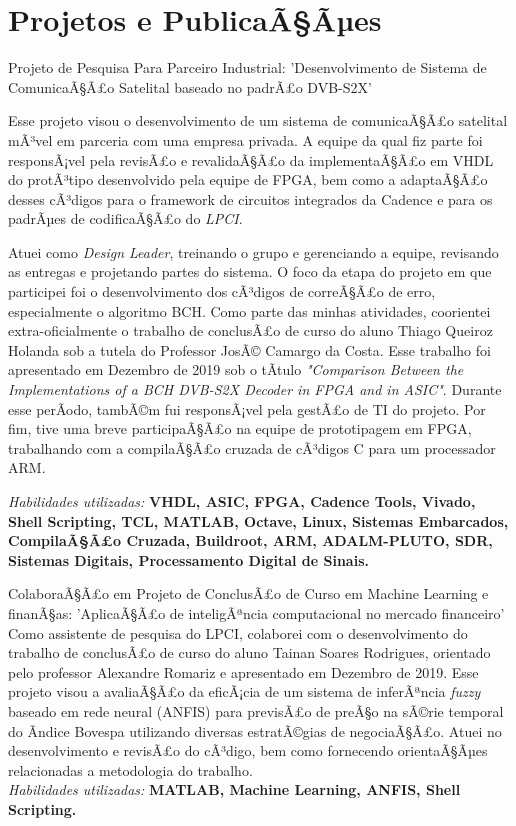 \documentclass[a4paper]{twentysecondcv} %
\begin{document}
\section{Projetos e PublicaÃ§Ãµes}
\begin{twenty}
\twentyitem
{Projeto de Pesquisa Para Parceiro Industrial:}
{'Desenvolvimento de Sistema de ComunicaÃ§Ã£o Satelital baseado no padrÃ£o DVB-S2X'}
{}
{\hspace{8pt} Esse projeto visou o desenvolvimento de um sistema de comunicaÃ§Ã£o satelital mÃ³vel em parceria com uma empresa privada. A equipe da qual fiz parte foi responsÃ¡vel pela revisÃ£o e revalidaÃ§Ã£o da implementaÃ§Ã£o em VHDL do protÃ³tipo desenvolvido pela equipe de FPGA, bem como a adaptaÃ§Ã£o desses cÃ³digos para o framework de circuitos integrados da Cadence e para os padrÃµes de codificaÃ§Ã£o do \textit{LPCI}. 

\hspace{8pt}Atuei como \textit{Design Leader}, treinando o grupo e gerenciando a equipe, revisando as entregas e projetando partes do sistema. O foco da etapa do projeto em que participei foi o desenvolvimento dos cÃ³digos de correÃ§Ã£o de erro, especialmente o algoritmo BCH. Como parte das minhas atividades, coorientei extra-oficialmente o trabalho de conclusÃ£o de curso do aluno Thiago Queiroz Holanda sob a tutela do Professor JosÃ© Camargo da Costa. Esse trabalho foi apresentado em Dezembro de 2019 sob o tÃ­tulo \textit{"Comparison Between the Implementations of a BCH DVB-S2X Decoder in FPGA and in ASIC"}. Durante esse perÃ­odo, tambÃ©m fui responsÃ¡vel pela gestÃ£o de TI do projeto. Por fim, tive uma breve participaÃ§Ã£o na equipe de prototipagem em FPGA, trabalhando com a compilaÃ§Ã£o cruzada de cÃ³digos C para um processador ARM.

\hspace{8pt}\textit{Habilidades utilizadas:} \textbf{VHDL, ASIC, FPGA, Cadence Tools, Vivado, Shell Scripting, TCL, MATLAB, Octave, Linux, Sistemas Embarcados, CompilaÃ§Ã£o Cruzada, Buildroot, ARM, ADALM-PLUTO, SDR, Sistemas Digitais, Processamento Digital de Sinais.\\}}


\twentyitem
{ColaboraÃ§Ã£o em Projeto de ConclusÃ£o de Curso em Machine Learning e finanÃ§as:}
{'AplicaÃ§Ã£o de inteligÃªncia computacional no mercado financeiro'}
{}
{\hspace{8pt} Como assistente de pesquisa do LPCI, colaborei com o desenvolvimento do trabalho de conclusÃ£o de curso do aluno Tainan Soares Rodrigues, orientado pelo professor Alexandre Romariz e apresentado em Dezembro de 2019. Esse projeto visou a avaliaÃ§Ã£o da eficÃ¡cia de um sistema de inferÃªncia \textit{fuzzy} baseado em rede neural (ANFIS) para previsÃ£o de preÃ§o na sÃ©rie temporal do Ã­ndice Bovespa utilizando diversas estratÃ©gias de negociaÃ§Ã£o. Atuei no desenvolvimento e revisÃ£o do cÃ³digo, bem como fornecendo orientaÃ§Ãµes relacionadas a metodologia do trabalho.\\
\textit{Habilidades utilizadas:} \textbf{MATLAB, Machine Learning, ANFIS, Shell Scripting.\\}}


\end{twenty}
\end{document}
